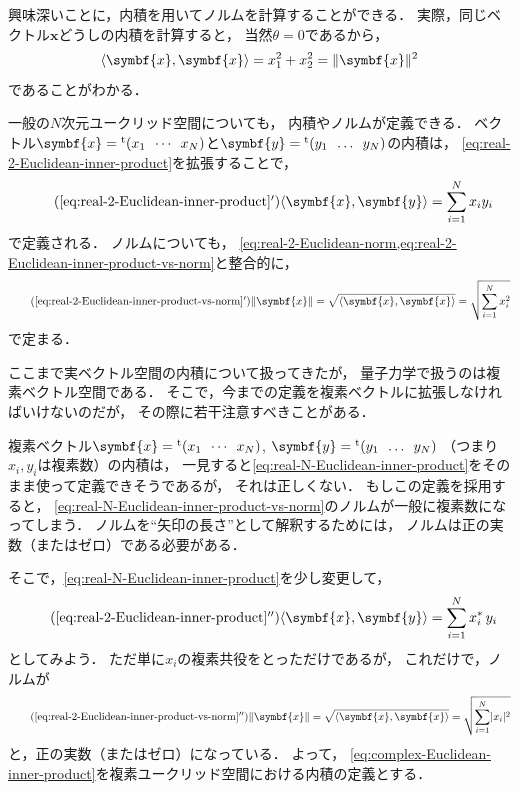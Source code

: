 \documentclass[
]{sotsu}
\begin{document}
興味深いことに，内積を用いてノルムを計算することができる．
実際，同じベクトル$\symbf{x}$どうしの内積を計算すると，
当然$\theta = 0$であるから，
\begin{equation}
    \label{eq:real-2-Euclidean-inner-product-vs-norm}
    \iparen{\symbf{x}, \symbf{x}} = x_1^2 + x_2^2 = \norm{\symbf{x}}^2
\end{equation}
であることがわかる．


\quad 
一般の$N$次元ユークリッド空間についても，
内積やノルムが定義できる．
ベクトル$\symbf{x} = \cvector{x_1 ; \cdots ; x_N}$と$\symbf{y} = \cvector{y_1 ; \dots ; y_N}$の内積は，
\cref{eq:real-2-Euclidean-inner-product}を拡張することで，
\begin{equation}
    \label{eq:real-N-Euclidean-inner-product}
    \tag{\ref*{eq:real-2-Euclidean-inner-product}$'$}
    \iparen{\symbf{x}, \symbf{y}}
    = \sum_{i = 1}^{N} x_i y_i
\end{equation}
で定義される．
ノルムについても，
\cref{eq:real-2-Euclidean-norm,eq:real-2-Euclidean-inner-product-vs-norm}と整合的に，
\begin{equation}
    \label{eq:real-N-Euclidean-inner-product-vs-norm}
    \tag{\ref*{eq:real-2-Euclidean-inner-product-vs-norm}$'$}
    \norm{\symbf{x}} 
    = \sqrt{\iparen{\symbf{x}, \symbf{x}}}
    = \sqrt{ \sum_{i = 1}^{N} x_i^2 }
\end{equation}
で定まる．


\quad 
ここまで実ベクトル空間の内積について扱ってきたが，
量子力学で扱うのは複素ベクトル空間である．
そこで，今までの定義を複素ベクトルに拡張しなければいけないのだが，
その際に若干注意すべきことがある．

複素ベクトル$\symbf{x} = \cvector{x_1 ; \cdots ; x_N}$, 
$\symbf{y} = \cvector{y_1 ; \dots ; y_N}$
（つまり$x_i, y_i$は複素数）の内積は，
一見すると\cref{eq:real-N-Euclidean-inner-product}をそのまま使って定義できそうであるが，
それは正しくない．
もしこの定義を採用すると，
\cref{eq:real-N-Euclidean-inner-product-vs-norm}のノルムが一般に複素数になってしまう．
ノルムを``矢印の長さ''として解釈するためには，
ノルムは正の実数（またはゼロ）である必要がある．

そこで，\cref{eq:real-N-Euclidean-inner-product}を少し変更して，
\begin{equation}
    \label{eq:complex-Euclidean-inner-product}
    \tag{\ref*{eq:real-2-Euclidean-inner-product}$''$}
    \iparen{\symbf{x}, \symbf{y}}
    = \sum_{i = 1}^{N} \conj{x_i} \, y_i
\end{equation}
としてみよう．
ただ単に$x_i$の複素共役をとっただけであるが，
これだけで，ノルムが
\begin{equation}
    \label{eq:complex-Euclidean-inner-product-vs-norm}
    \tag{\ref*{eq:real-2-Euclidean-inner-product-vs-norm}$''$}
    \norm{\symbf{x}} 
    = \sqrt{ \iparen{\symbf{x}, \symbf{x}} }
    = \sqrt{ \sum_{i = 1}^{N} \abs{x_i}^2 }
\end{equation}
と，正の実数（またはゼロ）になっている．
よって，
\cref{eq:complex-Euclidean-inner-product}を複素ユークリッド空間における内積の定義とする．
\end{document}
